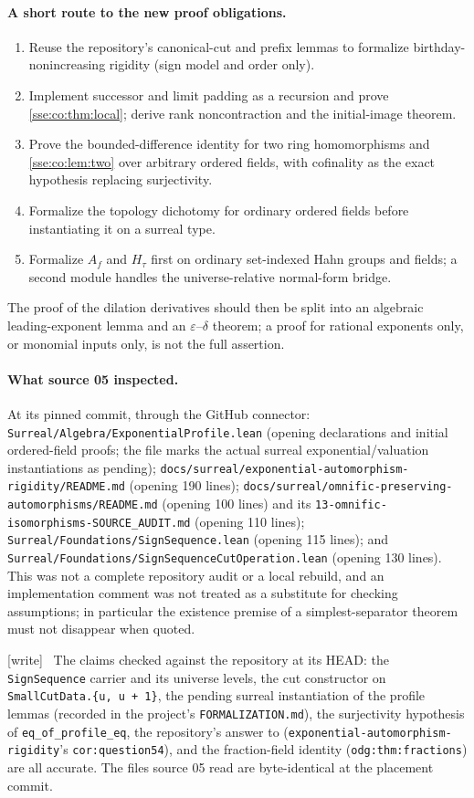\documentclass[11pt,a4paper]{article}
\numberwithin{equation}{section}
\theoremstyle{plain}
\theoremstyle{definition}
\theoremstyle{remark}
\newcommand{\code}[1]{\texttt{\small #1}}
\newcommand{\lbl}[1]{\nolinkurl{#1}}%
\newcommand{\fn}[1]{\nolinkurl{#1}}%
\newcommand{\wtag}{\textup{\textsf{[write]}}}%
\newenvironment{wnote}{\par\smallskip\noindent\wtag\ }{\par\smallskip}
\begin{document}
\paragraph{A short route to the new proof obligations.}
\begin{enumerate}
\item Reuse the repository's canonical-cut and prefix lemmas to formalize
birthday-nonincreasing rigidity (sign model and order only).
\item Implement successor and limit padding as a recursion and prove
\cref{sse:co:thm:local}; derive rank noncontraction and the initial-image
theorem.
\item Prove the bounded-difference identity for two ring homomorphisms and
\cref{sse:co:lem:two} over arbitrary ordered fields, with cofinality as the
exact hypothesis replacing surjectivity.
\item Formalize the topology dichotomy for ordinary ordered fields before
instantiating it on a surreal type.
\item Formalize $A_f$ and $H_\tau$ first on ordinary set-indexed Hahn groups
and fields; a second module handles the universe-relative normal-form bridge.
\end{enumerate}
The proof of the dilation derivatives should then be split into an algebraic
leading-exponent lemma and an $\varepsilon$--$\delta$ theorem; a proof for
rational exponents only, or monomial inputs only, is not the full assertion.

\paragraph{What source 05 inspected.} At its pinned commit, through the
GitHub connector: \fn{Surreal/Algebra/ExponentialProfile.lean} (opening
declarations and initial ordered-field proofs; the file marks the actual
surreal exponential/valuation instantiations as pending);
\fn{docs/surreal/exponential-automorphism-rigidity/README.md} (opening 190
lines); \fn{docs/surreal/omnific-preserving-automorphisms/README.md} (opening
100 lines) and its \fn{13-omnific-isomorphisms-SOURCE_AUDIT.md} (opening 110
lines); \fn{Surreal/Foundations/SignSequence.lean} (opening 115 lines); and
\fn{Surreal/Foundations/SignSequenceCutOperation.lean} (opening 130 lines).
This was not a complete repository audit or a local rebuild, and an
implementation comment was not treated as a substitute for checking
assumptions; in particular the existence premise of a simplest-separator
theorem must not disappear when quoted.
\begin{wnote}
The claims checked against the repository at its HEAD: the
\code{SignSequence} carrier and its universe levels, the cut constructor on
\code{SmallCutData.\{u, u + 1\}}, the pending surreal instantiation of the
profile lemmas (recorded in the project's \fn{FORMALIZATION.md}), the
surjectivity hypothesis of \code{eq\_of\_profile\_eq}, the repository's
answer to \cite[Question~5.4]{KKS} (\fn{exponential-automorphism-rigidity}'s
\lbl{cor:question54}), and the fraction-field identity
(\lbl{odg:thm:fractions}) are all accurate. The files source 05 read are
byte-identical at the placement commit.
\end{wnote}
\end{document}
